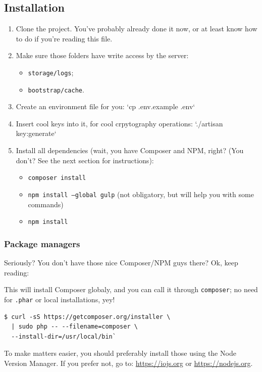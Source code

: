 \documentclass[12pt,a4paper,twoside,hyphens,english,brazil]{abntex2}
\begin{document}
{\begin{otherlanguage}{english}
\subsection{Installation}
\begin{enumerate}[itemsep=-1ex]
	\item Clone the project. You've probably already done it now, or at least know how to do if you're reading this file.
	\item Make sure those folders have write access by the server:
		\begin{itemize}[itemsep=-1ex,topsep=-1ex]
			\item \texttt{storage/logs};
			\item \texttt{bootstrap/cache}.
		\end{itemize}
	\item Create an environment file for you: `cp .env.example .env`
	\item Insert cool keys into it, for cool crpytography operations: `./artisan key:generate`
	\item Install all dependencies (wait, you have Composer and NPM, right? (You don't? See the next section for instructions):
		\begin{itemize}[itemsep=-1ex,topsep=-1ex]
			\item \texttt{composer install}
			\item \texttt{npm install --global gulp} (not obligatory, but will help you with some commands)
			\item \texttt{npm install}
		\end{itemize}
\end{enumerate}

\subsubsection{Package managers}
Seriously? You don't have those nice Composer/NPM guys there? Ok, keep reading:

This will install Composer globaly, and you can call it through \texttt{composer}; no need for \texttt{.phar} or local installations, yey!

\begin{verbatim}
$ curl -sS https://getcomposer.org/installer \
  | sudo php -- --filename=composer \
  --install-dir=/usr/local/bin`
\end{verbatim}

To make matters easier, you should preferably install those using the Node Version Manager. If you prefer not, go to: \url{https://iojs.org} or \url{https://nodejs.org}.


\end{otherlanguage}}
\end{document}
